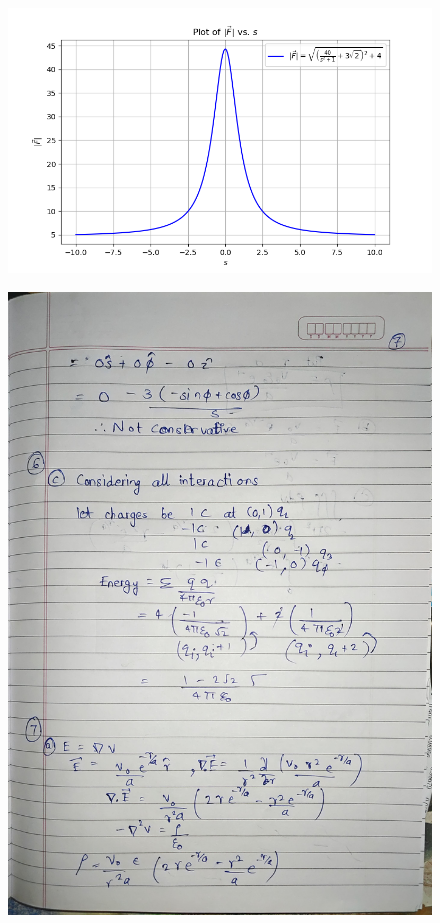\documentclass{article}
\begin{document}
\begin{figure}[H]
    \centering
    \includegraphics[width=\textwidth]{figs/5b.png}
\end{figure}
\begin{figure}[H]
    \centering
    \includegraphics[width=\textwidth]{figs/written/7.jpg}
\end{figure}
\end{document}
